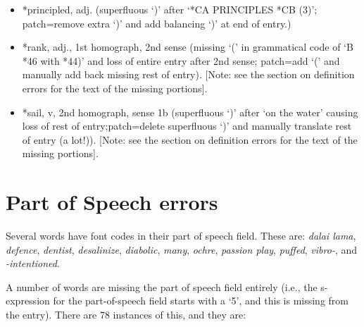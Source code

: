 \begin{itemize}
\item *principled, adj. (superfluous `)' after `*CA PRINCIPLES *CB (3)';
	patch=remove extra `)' and add balancing `)' at end of entry.)

\item *rank, adj., 1st homograph, 2nd sense (missing `(' in grammatical code 
	of `B *46 with *44)' and loss of entire entry after
	2nd sense; patch=add `(' and manually add back missing
	rest of entry).  [Note: see the section on definition errors for
        the text of the missing portions].

\item *sail, v, 2nd homograph, sense 1b (superfluous `)' after `on the water'
	causing loss of rest of entry;patch=delete superfluous `)'
	and manually translate rest of entry (a lot!)).  [Note: see the
        section on definition errors for the text of the missing portions].
\end{itemize}



\section{Part of Speech errors}
Several words have font codes in their part of speech field.  These
are: {\it dalai  lama}, {\it defence}, {\it dentist}, {\it desalinize},
{\it diabolic}, {\it many}, {\it ochre}, {\it passion play}, {\it puffed}, 
{\it vibro-}, and {\it -intentioned}.

A number of words are missing the part of speech field entirely (i.e., the
s-expression for the part-of-speech field starts with a `5', and this
is missing from the entry).  There are 78 instances of this, and they are: 

